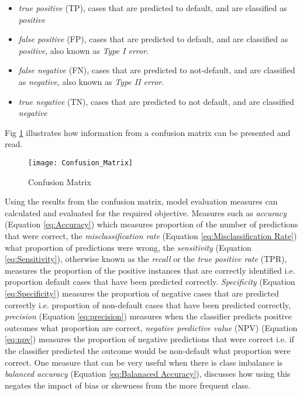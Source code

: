 \begin{itemize}
	\item \textit{true positive} (TP), cases that are predicted to default, and are {\color{green}{correctly}} classified as \textit{positive}
	\item \textit{false positive} (FP), cases that are predicted to default, and are {\color{red}{incorrectly}} classified as \textit{positive}, also known as \textit{Type I error}.
	\item \textit{false negative} (FN), cases that are predicted to not-default, and are {\color{red}{incorrectly}} classified as \textit{negative}, also known as \textit{Type II error}.
	\item  \textit{true negative} (TN), cases that are predicted to not default, and are {\color{green}{correctly}} classified \textit{negative}
	
\end{itemize}

Fig \ref{fig:ConfusionMatrix} illustrates how information from a confusion matrix can be presented and read.

\begin{figure}[H]
	\texttt{[image: Confusion\_Matrix]}
	\caption[Confusion Matrix]
	{Confusion Matrix}
	\label{fig:ConfusionMatrix}
\end{figure}

Using the results from the confusion matrix, model evaluation measures can calculated and evaluated for the required objective. Measures such as \textit{accuracy} (Equation \ref{eq:Accuracy}) which measures proportion of the number of predictions that were correct, the \textit{misclassification rate} (Equation \ref{eq:Misclassification Rate}) what proportion of predictions were wrong, the \textit{sensitivity} (Equation \ref{eq:Sensitivity}), otherwise known as the \textit{recall} or the \textit{true positive rate} (TPR), measures the proportion of the positive instances that are correctly identified i.e. proportion default cases that have been predicted correctly. \textit{Specificity} (Equation \ref{eq:Specificity}) measures the proportion of negative cases that are predicted correctly i.e. proportion of non-default cases that have been predicted correctly, \textit{precision} (Equation \ref{eq:precision}) measures when the classifier predicts positive outcomes what proportion are correct, \textit{negative predictive value} (NPV) (Equation \ref{eq:npv}) measures the proportion of negative predictions that were correct i.e. if the classifier predicted the outcome would be non-default what proportion were correct. One measure that can be very useful when there is class imbalance is \textit{balanced accuracy} (Equation \ref{eq:Balanaced Accuracy}), \citep{brodersen_balanced_2010} discusses how using this negates the impact of bias or skewness from the more frequent class.


